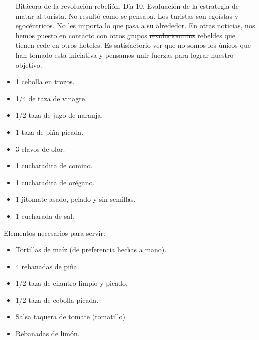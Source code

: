 \documentclass[12pt,twoside,openright,a5paper]{book}
\begin{document}
\begin{itemize}
\vspace{0.5cm}

\hrulefill\hspace{0.2cm} \decofourleft\decofourright \hspace{0.2cm} \hrulefill
\vspace{0.5cm}

Bitácora de la \st{revolución} rebelión. Día 10. Evaluación de la estrategia de
matar al turista. No resultó como se pensaba. Los turistas son egoístas y
egocéntricos. No les importa lo que pasa a su alrededor. En otras noticias,
nos hemos puesto en contacto con otros grupos \st{revolucionarios}
rebeldes que tienen
cede en otros hoteles. Es satisfactorio ver que no somos los únicos que han
tomado esta iniciativa y pensamos unir fuerzas para lograr nuestro objetivo.


\vspace{0.5cm}

\hrulefill\hspace{0.2cm} \decofourleft\decofourright \hspace{0.2cm} \hrulefill
\vspace{0.5cm}

\item 1 cebolla en trozos.  \item 1/4 de taza
de vinagre.  \item 1/2 taza de jugo de naranja.  \item 1 taza de piña
picada.  \item 3 clavos de olor.  \item 1 cucharadita de comino.  \item 1
cucharadita de orégano.  \item 1 jitomate asado, pelado y sin semillas.
\item 1 cucharada de sal.  \end {itemize}

Elementos necesarios para servir:

\begin{itemize} \item Tortillas de maíz (de preferencia hechas a mano).
\item 4 rebanadas de piña.  \item 1/2 taza de cilantro limpio y picado.
\item 1/2 taza de cebolla picada.  \item Salsa taquera de tomate (tomatillo).
\item Rebanadas de limón.  \end{itemize}
\end{document}
